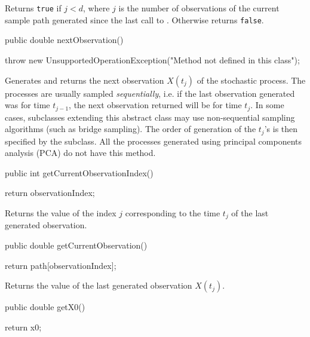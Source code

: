 \begin{tabb}
Returns \texttt{true} if $j<d$, where $j$ is the number of observations of the current
sample path generated since the last call to .
Otherwise returns \texttt{false}.
\end{tabb}
\begin{code}

   public double nextObservation()\begin{hide} {
        throw new UnsupportedOperationException("Method not defined in this class");
    }\end{hide}
\end{code}
\begin{tabb}
Generates and returns the next observation $X(t_j)$ of the stochastic process.
The processes are usually sampled \emph{sequentially}, i.e.
if the last observation generated was for time $t_{j-1}$, the next observation
returned will be for time $t_{j}$.
In some cases, subclasses extending this abstract class
may use non-sequential sampling algorithms (such as bridge sampling).
The order of generation of the $t_{j}$'s is then specified by the subclass.
All the processes generated using principal components analysis (PCA) do not have
this method.
\end{tabb}
\begin{code}

   public int getCurrentObservationIndex() \begin{hide} {
        return observationIndex;
    }\end{hide}
\end{code}
\begin{tabb} Returns the value of the index $j$ corresponding to
the time $t_{j}$ of the last generated observation.
\end{tabb}
\begin{code}

   public double getCurrentObservation() \begin{hide} {
        return path[observationIndex];
    }\end{hide}
\end{code}
\begin{tabb} Returns the value of the last generated observation $X(t_{j})$.
\end{tabb}
\begin{code}

   public double getX0() \begin{hide} {
        return x0;
    }\end{hide}
\end{code}

